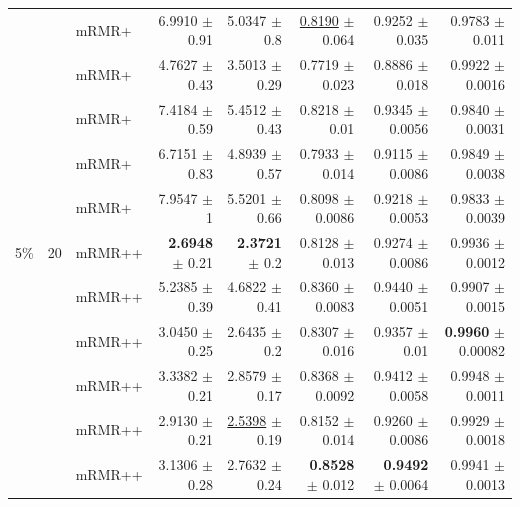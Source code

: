 \begin{longtable}{llp{}rrrrr}
 &  & mRMR+ & 6.9910 {\scriptsize $\pm$ 0.91} & 5.0347 {\scriptsize $\pm$ 0.8} & \underline{0.8190} {\scriptsize $\pm$ 0.064} & 0.9252 {\scriptsize $\pm$ 0.035} & 0.9783 {\scriptsize $\pm$ 0.011} \\
 &  & mRMR+ & 4.7627 {\scriptsize $\pm$ 0.43} & 3.5013 {\scriptsize $\pm$ 0.29} & 0.7719 {\scriptsize $\pm$ 0.023} & 0.8886 {\scriptsize $\pm$ 0.018} & 0.9922 {\scriptsize $\pm$ 0.0016} \\
 &  & mRMR+ & 7.4184 {\scriptsize $\pm$ 0.59} & 5.4512 {\scriptsize $\pm$ 0.43} & 0.8218 {\scriptsize $\pm$ 0.01} & 0.9345 {\scriptsize $\pm$ 0.0056} & 0.9840 {\scriptsize $\pm$ 0.0031} \\
 &  & mRMR+ & 6.7151 {\scriptsize $\pm$ 0.83} & 4.8939 {\scriptsize $\pm$ 0.57} & 0.7933 {\scriptsize $\pm$ 0.014} & 0.9115 {\scriptsize $\pm$ 0.0086} & 0.9849 {\scriptsize $\pm$ 0.0038} \\
 &  & mRMR+ & 7.9547 {\scriptsize $\pm$ 1} & 5.5201 {\scriptsize $\pm$ 0.66} & 0.8098 {\scriptsize $\pm$ 0.0086} & 0.9218 {\scriptsize $\pm$ 0.0053} & 0.9833 {\scriptsize $\pm$ 0.0039} \\
\midrule
5\% & 20 & mRMR++ & \textbf{2.6948} {\scriptsize $\pm$ 0.21} & \textbf{2.3721} {\scriptsize $\pm$ 0.2} & 0.8128 {\scriptsize $\pm$ 0.013} & 0.9274 {\scriptsize $\pm$ 0.0086} & 0.9936 {\scriptsize $\pm$ 0.0012} \\
 &  & mRMR++ & 5.2385 {\scriptsize $\pm$ 0.39} & 4.6822 {\scriptsize $\pm$ 0.41} & 0.8360 {\scriptsize $\pm$ 0.0083} & 0.9440 {\scriptsize $\pm$ 0.0051} & 0.9907 {\scriptsize $\pm$ 0.0015} \\
 &  & mRMR++ & 3.0450 {\scriptsize $\pm$ 0.25} & 2.6435 {\scriptsize $\pm$ 0.2} & 0.8307 {\scriptsize $\pm$ 0.016} & 0.9357 {\scriptsize $\pm$ 0.01} & \textbf{0.9960} {\scriptsize $\pm$ 0.00082} \\
 &  & mRMR++ & 3.3382 {\scriptsize $\pm$ 0.21} & 2.8579 {\scriptsize $\pm$ 0.17} & 0.8368 {\scriptsize $\pm$ 0.0092} & 0.9412 {\scriptsize $\pm$ 0.0058} & 0.9948 {\scriptsize $\pm$ 0.0011} \\
 &  & mRMR++ & 2.9130 {\scriptsize $\pm$ 0.21} & \underline{2.5398} {\scriptsize $\pm$ 0.19} & 0.8152 {\scriptsize $\pm$ 0.014} & 0.9260 {\scriptsize $\pm$ 0.0086} & 0.9929 {\scriptsize $\pm$ 0.0018} \\
 &  & mRMR++ & 3.1306 {\scriptsize $\pm$ 0.28} & 2.7632 {\scriptsize $\pm$ 0.24} & \textbf{0.8528} {\scriptsize $\pm$ 0.012} & \textbf{0.9492} {\scriptsize $\pm$ 0.0064} & 0.9941 {\scriptsize $\pm$ 0.0013} \\

\end{longtable}
